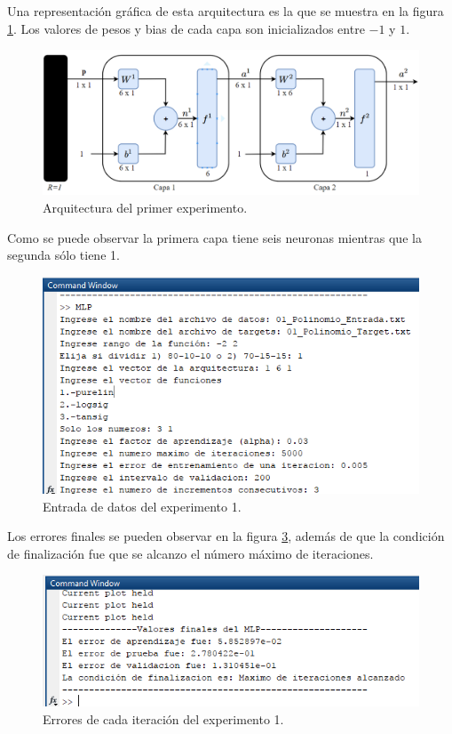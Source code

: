\documentclass[12pt, titlepage]{article}
\begin{document}
Una representación gráfica de esta arquitectura es la que se muestra en la figura \ref{fig:arqui1}. Los valores de pesos y bias de cada capa son inicializados entre $-1$ y $1$.
\begin{figure}[H]
    \begin{center}
        \includegraphics[width=14cm]{img/arqui1.png}
        \caption{Arquitectura del primer experimento.}
        \label{fig:arqui1}
    \end{center}
\end{figure}
Como se puede observar la primera capa tiene seis neuronas mientras que la segunda sólo tiene 1.
\begin{figure}[H]
    \begin{center}
        \includegraphics[width=14cm]{1/entrada.png}
        \caption{Entrada de datos del experimento 1.}
        \label{fig:entrada1}
    \end{center}
\end{figure}
Los errores finales se pueden observar en la figura \ref{fig:salida1}, además de que la condición de finalización fue que se alcanzo el número máximo de iteraciones.
\begin{figure}[H]
    \begin{center}
        \includegraphics[width=14cm]{1/salida.png}
        \caption{Errores de cada iteración del experimento 1.}
        \label{fig:salida1}
    \end{center}
\end{figure}
\end{document}

